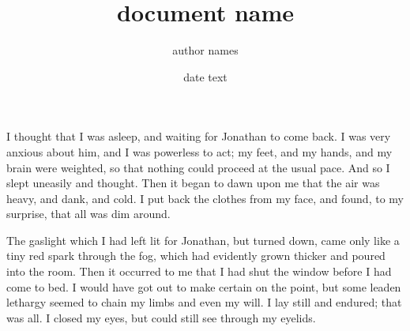 \documentclass[12pt,a5paper,twocolumn,twoside,openright,titlepage]{book}
\begin{document}
\pagestyle{headings}


\setlength{\textwidth}{11cm}

\title{document name}
\author{author names}
\date{date text}

\maketitle

\setcounter{page}{257}

I thought that I was asleep, and waiting for Jonathan to come back.
I was very anxious about him, and I was powerless to act; my feet,
and my hands, and my brain were weighted, so that nothing could proceed
at the usual pace. And so I slept uneasily and thought. Then it began to
dawn upon me that the air was heavy, and dank, and cold. I put back the
clothes from my face, and found, to my surprise, that all was dim around.

The gaslight which I had left lit for Jonathan, but turned down, came only
like a tiny red spark through the fog, which had evidently grown thicker and
poured into the room. Then it occurred to me that I had shut the window before
I had come to bed. I would have got out to make certain on the point, but some
leaden lethargy seemed to chain my limbs and even my will. I lay still and endured;
that was all. I closed my eyes, but could still see through my eyelids.
\end{document}
